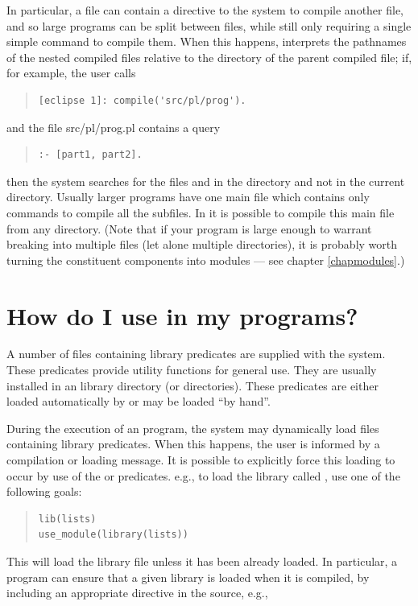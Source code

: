 In particular, a file can contain a directive to the system
to compile another file, and so large programs can be split between files,
while still only requiring a single simple command to compile them.%
When this happens, {\eclipse} interprets the pathnames of the nested
compiled files relative to the directory of the parent compiled file;
if, for example, the user calls
\begin{quote}
\begin{verbatim}
[eclipse 1]: compile('src/pl/prog').
\end{verbatim}
\end{quote}
and the file src/pl/prog.pl contains a query
\begin{quote}
\begin{verbatim}
:- [part1, part2].
\end{verbatim}
\end{quote}
then the system searches for the files  and
in the
directory  and not in the current directory.
Usually larger {\eclipse} programs have one main file which contains
only commands to compile all the subfiles.
In {\eclipse} it is possible to compile this main file from any directory.
(Note that if your program is large enough to warrant breaking into multiple
files (let alone multiple directories), it is probably worth turning the
constituent components into modules --- see chapter \ref{chapmodules}.)

\section{How do I use {\eclipse}  in my programs?}

A number of files containing library predicates are supplied with
the {\eclipse} system.
These predicates provide utility functions for general use.
They are usually installed in an {\eclipse} library directory (or
directories).
These predicates are either loaded automatically by {\eclipse} or may be
loaded ``by hand''.

During the execution of an {\eclipse} program, the system may dynamically
load files containing library predicates. When this happens, the user is
informed by a compilation or loading message.
It is possible to explicitly force this loading to occur by use
of the  or
 predicates.
e.g., to load the library
called , use one of the following goals:
\begin{quote}
\begin{verbatim}
lib(lists)
use_module(library(lists))
\end{verbatim} 
\end{quote}
This will load the library file unless it has been already loaded.
In particular, a program can ensure that a given library is loaded when it
is compiled, by including an appropriate directive in the source, e.g.,

